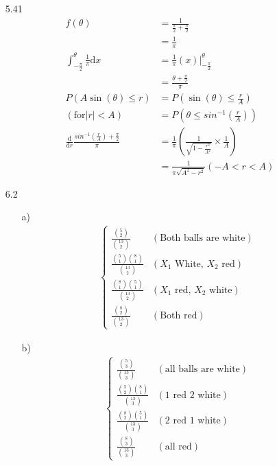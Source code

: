 \documentclass{article}
\begin{document}
\begin{itemize}
    \item [5.41]
    \begin{align*}
        f(\theta)&=\frac{1}{\frac{\pi}{2}+\frac{\pi}{2}}\\
        &=\frac{1}{\pi}\\
        \int_{-\frac{\pi}{2}}^{\theta} \frac{1}{\pi} \text{d} x&=\frac{1}{\pi}\left.(x)\right|^{\theta}_{-\frac{\pi}{2}}\\
        &=\frac{\theta+\frac{\pi}{2}}{\pi}\\
        P(A\sin(\theta)\leq r)&=P(\sin(\theta)\leq \frac{r}{A})\\
        (\text{for} |r|<A) &= P(\theta \leq sin^{-1}(\frac{r}{A}))\\
        \frac{\text{d}}{\text{d}r}\frac{sin^{-1}(\frac{r}{A})+\frac{\pi}{2}}{\pi}&=\frac{1}{\pi}\left(\frac{1}{\sqrt{1-\frac{r^2}{A^2}}}\times \frac{1}{A}\right)\\
        &=\frac{1}{\pi\sqrt{A^2-r^2}} (-A<r<A)
    \end{align*}
    \item [6.2]
    \begin{itemize}
        \item [a)]\begin{align*}
            \left\{\begin{matrix}
                \frac{\binom{5}{2}}{\binom{13}{2}} & (\text{Both balls are white})\\
                \frac{\binom{5}{1}\binom{8}{1}}{\binom{13}{2}}& (\text{\(X_1\) White, \(X_2\) red})\\
                \frac{\binom{8}{1}\binom{5}{1}}{\binom{13}{2}}& (\text{\(X_1\) red, \(X_2\) white})\\
                \frac{\binom{8}{2}}{\binom{13}{2}}& (\text{Both red})
            \end{matrix}\right.
        \end{align*}
        \item [b)]\begin{align*}
            \left\{\begin{matrix}
                \frac{\binom{5}{3}}{\binom{13}{3}} & (\text{all balls are white})\\
                \frac{\binom{5}{2}\binom{8}{1}}{\binom{13}{3}}& (\text{1 red 2 white})\\
                \frac{\binom{8}{2}\binom{5}{1}}{\binom{13}{3}}& (\text{2 red 1 white})\\
                \frac{\binom{8}{3}}{\binom{13}{3}}& (\text{all red})

\end{matrix}
\end{align*}
\end{itemize}
\end{itemize}
\end{document}
